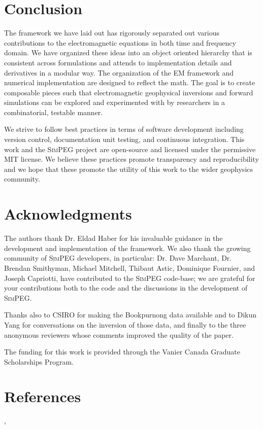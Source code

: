 \documentclass[preprint,review,3p,times,onecolumn,authoryear]{elsarticle}
\newcommand{\SimPEG}{\textsc{SimPEG}\xspace}
\begin{document}
\section{Conclusion}
\label{sec:Conclusion}

The framework we have laid out has rigorously separated out various
contributions to the electromagnetic equations in both time and frequency domain.
We have organized these ideas into an object oriented hierarchy
that is consistent across formulations and attends to
implementation details and derivatives in a modular way.
The organization of the EM framework and numerical implementation are designed to reflect the math.
The goal is to create composable pieces such that electromagnetic
geophysical inversions and forward simulations can be explored and experimented
with by researchers in a combinatorial, testable manner.

We strive to follow best practices in terms of software development including
version control, documentation unit testing, and continuous integration. This work
and the \SimPEG project are open-source and licensed under the permissive MIT
license. We believe these practices promote transparency and reproducibility and we hope
that these promote the utility of this work to the wider geophysics community.

{%
\section*{Acknowledgments}

\label{sec:acknowledgments}
The authors thank Dr. Eldad Haber for his invaluable guidance
in the development and implementation of the framework.
We also thank the  growing community of \SimPEG developers, in particular:
Dr. Dave Marchant, Dr. Brendan Smithyman, Michael Mitchell,
Thibaut Astic, Dominique Fournier, and Joseph Capriotti,
have contributed to the \SimPEG code-base; we are grateful for your
contributions both to the code and the discussions in the development of \SimPEG.

Thanks also to CSIRO for making the Bookpurnong data available and to Dikun
Yang for conversations on the inversion of those data, and finally to the
three anonymous reviewers whose comments improved the quality of the paper.

The funding for this work is provided through the Vanier Canada Graduate
Scholarships Program.

}

\section*{References}


,
\end{document}
